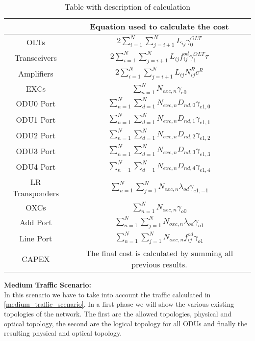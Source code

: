 \begin{table}[h!]
\centering
\begin{tabular}{|| c | c ||}
 \hline
  & Equation used to calculate the cost \\ \hline
 OLTs & \(\displaystyle 2 \sum_{i=1}^{N}\sum_{j=i+1}^{N} L_{ij} \gamma_0^{OLT} \) \\ \hline
 Transceivers & \(\displaystyle 2 \sum_{i=1}^{N}\sum_{j=i+1}^{N} L_{ij} f_{ij}^{od} \gamma_1^{OLT} \tau \) \\ \hline
 Amplifiers & \(\displaystyle 2 \sum_{i=1}^{N}\sum_{j=i+1}^{N} L_{ij} N^R_{ij} c^R \) \\ \hline
 EXCs & \(\displaystyle \sum_{n=1}^N N_{exc,n} \gamma_{e0} \) \\ \hline
 ODU0 Port & \(\displaystyle \sum_{n=1}^{N} \sum_{d=1}^{N} N_{exc,n} D_{nd,0} \gamma_{e1,0} \) \\ \hline
 ODU1 Port & \(\displaystyle \sum_{n=1}^{N} \sum_{d=1}^{N} N_{exc,n} D_{nd,1} \gamma_{e1,1} \) \\ \hline
 ODU2 Port & \(\displaystyle \sum_{n=1}^{N} \sum_{d=1}^{N} N_{exc,n} D_{nd,2} \gamma_{e1,2} \)\\ \hline
 ODU3 Port & \(\displaystyle \sum_{n=1}^{N} \sum_{d=1}^{N} N_{exc,n} D_{nd,3} \gamma_{e1,3} \) \\ \hline
 ODU4 Port & \(\displaystyle \sum_{n=1}^{N} \sum_{d=1}^{N} N_{exc,n} D_{nd,4} \gamma_{e1,4} \) \\ \hline
 LR Transponders & \(\displaystyle \sum_{n=1}^{N} \sum_{j=1}^{N} N_{exc,n} \lambda_{od} \gamma_{e1,-1} \) \\ \hline
 OXCs & \(\displaystyle \sum_{n=1}^N N_{oxc,n} \gamma_{o0} \) \\ \hline
 Add Port & \(\displaystyle \sum_{n=1}^{N} \sum_{j=1}^{N} N_{oxc,n} \lambda_{od} \gamma_{o1} \) \\ \hline
 Line Port & \(\displaystyle \sum_{n=1}^{N} \sum_{j=1}^{N} N_{oxc,n} f_{ij}^{od} \gamma_{o1} \) \\ \hline
 CAPEX & The final cost is calculated by summing all previous results. \\
 \hline
 \end{tabular}
\caption{Table with description of calculation}
\label{formulas_transp}
\end{table}

\newpage
\textbf{Medium Traffic Scenario:}\\

In this scenario we have to take into account the traffic calculated in \ref{medium_traffic_scenario}. In a first phase we will show the various existing topologies of the network. The first are the allowed topologies, physical and optical topology, the second are the logical topology for all ODUs and finally the resulting physical and optical topology.\\

